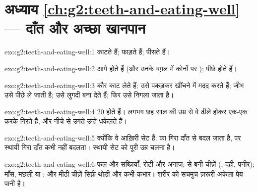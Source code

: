 \section*{अध्याय \ref{ch:g2:teeth-and-eating-well} --- दाँत और अच्छा खानपान}

\begin{solution}{exo:g2:teeth-and-eating-well:1}
 काटते हैं;  फाड़ते हैं;  पीसते हैं।
\end{solution}

\begin{solution}{exo:g2:teeth-and-eating-well:2}
 आगे होते हैं (और उनके बग़ल में कोनों पर );  पीछे होते
हैं।
\end{solution}

\begin{solution}{exo:g2:teeth-and-eating-well:3}
 कौर काट लेते हैं;  उसे पकड़कर खींचने में मदद करते हैं; जीभ
उसे पीछे ले जाती है;  उसे लुगदी बना देते हैं; फिर उसे निगला
जाता है।
\end{solution}

\begin{solution}{exo:g2:teeth-and-eating-well:4}
 $20$ होते हैं। लगभग छह साल की उम्र से वे ढीले होकर एक-एक
करके गिरते हैं, और नीचे से उगते  उन्हें धकेलते हैं।
\end{solution}

\begin{solution}{exo:g2:teeth-and-eating-well:5}
क्योंकि वे आख़िरी सेट हैं:  का गिरा दाँत  से बदल जाता
है, पर स्थायी गिरा दाँत कभी नहीं बदलता। स्थायी सेट को पूरी उम्र चलना
है।
\end{solution}

\begin{solution}{exo:g2:teeth-and-eating-well:6}
फल और सब्ज़ियाँ; रोटी और अनाज;  से बनी चीज़ें (, दही, पनीर);
माँस, मछली या ; और मीठी चीज़ें सिर्फ़ थोड़ी और कभी-कभार। शरीर को
सचमुच ज़रूरी अकेला पेय पानी है।
\end{solution}

